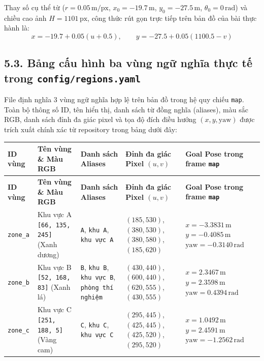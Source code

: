 Thay số cụ thể từ  ($r = 0.05\,\text{m/px}$, $x_0 = -19.7\,\text{m}$, $y_0 = -27.5\,\text{m}$, $\theta_0 = 0\,\text{rad}$) và chiều cao ảnh $H = 1101\,\text{px}$, công thức rút gọn trực tiếp trên bản đồ của bài thực hành là:
\begin{equation}
  x = -19.7 + 0.05(u + 0.5), \qquad y = -27.5 + 0.05(1100.5 - v)
\end{equation}

\subsection*{5.3. Bảng cấu hình ba vùng ngữ nghĩa thực tế trong \texttt{config/regions.yaml}}

File  định nghĩa 3 vùng ngữ nghĩa hợp lệ trên bản đồ  trong hệ quy chiếu \texttt{map}. Toàn bộ thông số ID, tên hiển thị, danh sách từ đồng nghĩa (aliases), màu sắc RGB, danh sách đỉnh đa giác pixel và tọa độ đích điều hướng $(x, y, \text{yaw})$ được trích xuất chính xác từ repository trong bảng dưới đây:

\begin{longtable}{|p{}|p{}|p{}|p{}|p{}|}
\hline
\textbf{ID vùng} & \textbf{Tên vùng \& Màu RGB} & \textbf{Danh sách Aliases} & \textbf{Đỉnh đa giác Pixel $(u, v)$} & \textbf{Goal Pose trong frame \texttt{map}} \\
\hline
\endfirsthead
\hline
\textbf{ID vùng} & \textbf{Tên vùng \& Màu RGB} & \textbf{Danh sách Aliases} & \textbf{Đỉnh đa giác Pixel $(u, v)$} & \textbf{Goal Pose trong frame \texttt{map}} \\
\hline
\endhead
\texttt{zone\_a} & Khu vực A \newline \texttt{[66, 135, 245]} (Xanh dương) & \texttt{A}, \texttt{khu A}, \texttt{khu vực A} & $(185, 530)$, $(380, 530)$, $(380, 580)$, $(185, 620)$ & $x = -3.3831\,\text{m}$ \newline $y = -0.4085\,\text{m}$ \newline $\text{yaw} = -0.3140\,\text{rad}$ \\
\hline
\texttt{zone\_b} & Khu vực B \newline \texttt{[52, 168, 83]} (Xanh lá) & \texttt{B}, \texttt{khu B}, \texttt{khu vực B}, \texttt{phòng thí nghiệm} & $(430, 440)$, $(600, 440)$, $(620, 555)$, $(430, 555)$ & $x = 2.3467\,\text{m}$ \newline $y = 2.3598\,\text{m}$ \newline $\text{yaw} = 0.4394\,\text{rad}$ \\
\hline
\texttt{zone\_c} & Khu vực C \newline \texttt{[251, 188, 5]} (Vàng cam) & \texttt{C}, \texttt{khu C}, \texttt{khu vực C} & $(295, 445)$, $(425, 445)$, $(425, 520)$, $(295, 520)$ & $x = 1.0492\,\text{m}$ \newline $y = 2.4591\,\text{m}$ \newline $\text{yaw} = -1.2562\,\text{rad}$ \\
\hline
\end{longtable}

